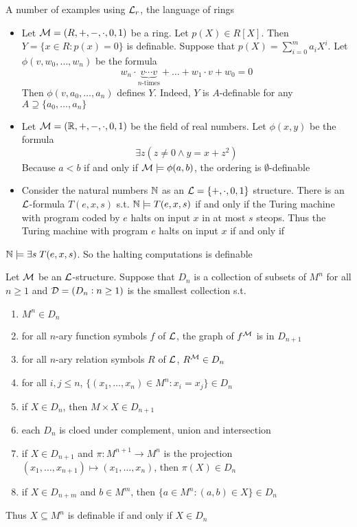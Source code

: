 \documentclass[11pt]{article}
\begin{document}
A number of examples using \(\mathcal{L}_r\), the language of rings
\begin{itemize}
\item Let \(\mathcal{M}=(R,+,-,\cdot,0,1)\) be a ring. Let \(p(X)\in R[X]\). Then 
\(Y=\{x\in R:p(x)=0\}\) is definable. Suppose that
\(p(X)=\displaystyle\sum_{i=0}^ma_iX^i\). Let \(\phi(v,w_0,\dots,w_n)\) be the
formula
\begin{equation*}
w_n\cdot\underbrace{v\cdots v}_{n\text{-times}}+\dots+w_1\cdot v+w_0=0
\end{equation*}
Then \(\phi(v,a_0,\dots,a_n)\) defines \(Y\). Indeed, \(Y\) is \(A\)-definable
for any \(A\supseteq\{a_0,\dots,a_n\}\)
\item Let \(\mathcal{M}=(\mathbb{R},+,-,\cdot,0,1)\) be the field of real numbers. Let
\(\phi(x,y)\) be the formula 
\begin{equation*}
\exists z(z\neq 0\wedge y=x+z^2)
\end{equation*}
Because \(a<b\) if and only if \(\mathcal{M}\models\phi(a,b)\), the ordering is
\(\emptyset\)-definable
\item Consider the natural numbers \(\mathbb{N}\) as an \(\mathcal{L}=\{+,\cdot,0,1\}\) structure.
There is an \(\mathcal{L}\)-formula \(T(e,x,s)\) s.t. \(\mathbb{N}\models T(e,x,s)\) if and
only if the Turing machine with program coded by \(e\) halts on input \(x\) in
at most \(s\) steops. Thus the Turing machine with program \(e\) halts on input
\(x\) if and only if
\end{itemize}

\(\mathbb{N}\models\exists s\;T(e,x,s)\). So the halting
    computations is definable


\begin{proposition}[]
Let \(\mathcal{M}\) be an \(\mathcal{L}\)-structure. Suppose that \(D_n\) is a collection of
subsets of \(M^n\) for all \(n\ge 1\) and \(\mathcal{D}=(D_n:n\ge 1)\) is the smallest
collection s.t. 
\begin{enumerate}
\item \(M^n\in D_n\)
\item for all \(n\)-ary function symbols \(f\) of \(\mathcal{L}\), the graph of \(f^{\mathcal{M}}\)
is in \(D_{n+1}\)
\item for all \(n\)-ary relation symbols \(R\) of \(\mathcal{L}\), \(R^{\mathcal{M}}\in D_n\)
\item for all \(i,j\le n\), \(\{(x_1,\dots,x_n)\in M^n:x_i=x_j\}\in D_n\)
\item if \(X\in D_n\), then \(M\times X\in D_{n+1}\)
\item each \(D_n\) is cloed under complement, union and intersection
\item if \(X\in D_{n+1}\) and \(\pi:M^{n+1}\to M^n\) is the projection 
\((x_1,\dots,x_{n+1})\mapsto(x_1,\dots,x_n)\), then \(\pi(X)\in D_n\)
\item if \(X\in D_{n+m}\) and \(b\in M^m\), then \(\{a\in M^n:(a,b)\in X\}\in D_n\)
\end{enumerate}


Thus \(X\subseteq M^n\) is definable if and only if \(X\in D_n\)
\end{proposition}
\end{document}
